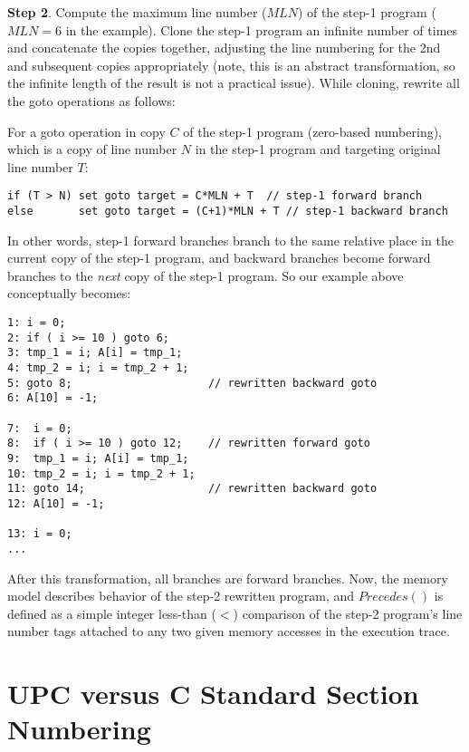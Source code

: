 \documentclass[12pt,titlepage]{article}
\begin{document}
\textbf{Step 2}. Compute the maximum line number ($MLN$) of the step-1 program
($MLN=6$ in the example). Clone the step-1 program an infinite number of times
and concatenate the copies together, adjusting the line numbering for the 2nd
and subsequent copies appropriately (note, this is an abstract transformation,
so the infinite length of the result is not a practical issue). While cloning,
rewrite all the goto operations as follows: 

For a goto operation in copy $C$ of the step-1 program (zero-based numbering),
which is a copy of line number $N$ in the step-1 program and targeting
original line number $T$: 
\begin{verbatim}
if (T > N) set goto target = C*MLN + T  // step-1 forward branch 
else       set goto target = (C+1)*MLN + T // step-1 backward branch 
\end{verbatim}
In other words, step-1 forward branches branch to the same relative place in
the current copy of the step-1 program, and backward branches become forward
branches to the \emph{next} copy of the step-1 program.  So our example above
conceptually becomes:
\begin{verbatim}
1: i = 0;
2: if ( i >= 10 ) goto 6;
3: tmp_1 = i; A[i] = tmp_1;
4: tmp_2 = i; i = tmp_2 + 1;
5: goto 8;                     // rewritten backward goto 
6: A[10] = -1;

7:  i = 0;
8:  if ( i >= 10 ) goto 12;    // rewritten forward goto 
9:  tmp_1 = i; A[i] = tmp_1;
10: tmp_2 = i; i = tmp_2 + 1;
11: goto 14;                   // rewritten backward goto 
12: A[10] = -1;

13: i = 0;
...
\end{verbatim}

After this transformation, all branches are forward branches. Now, the memory
model describes behavior of the step-2 rewritten program, and $Precedes()$ is
defined as a simple integer less-than ($<$) comparison of the step-2 program's
line number tags attached to any two given memory accesses in the execution
trace.

\pagebreak
\section{UPC versus C Standard Section Numbering}
\end{document}
